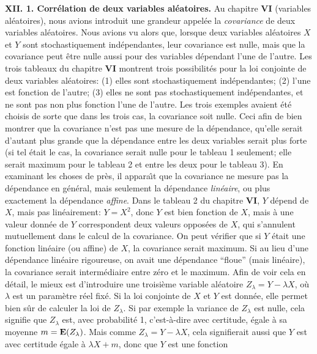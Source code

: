 {\bf XII. 1. Corr\'elation de deux variables al\'eatoires.}
\medskip 
Au chapitre {\bf VI} (variables al\'eatoires), nous avions introduit une 
grandeur appel\'ee la {\it covariance} de deux variables al\'eatoires. 
Nous avions vu alors que, lorsque deux variables al\'eatoires $X$ et $Y$ 
sont stochastiquement ind\'ependantes, leur covariance est nulle, mais 
que la covariance peut \^etre nulle aussi pour des variables d\'ependant 
l'une de l'autre. Les trois tableaux du chapitre {\bf VI} montrent trois 
possibilit\'es pour la loi conjointe de deux va\-ria\-bles al\'eatoires: 
(1) elles sont stochastiquement ind\'ependantes; (2) l'une est fonction de 
l'autre; (3) elles ne sont pas stochastiquement ind\'ependantes, et ne 
sont pas non plus fonction l'une de l'autre. Les trois exemples avaient
\'et\'e choisis de sorte que dans les trois cas, la covariance soit nulle. 
Ceci afin de bien montrer que la covariance n'est pas une mesure de la 
d\'ependance, qu'elle serait d'autant plus grande que la d\'ependance entre 
les deux varia\-bles serait plus forte (si tel \'etait le cas, la covariance 
serait nulle pour le tableau 1 seulement; elle serait maximum pour le 
tableau 2 et entre les deux pour le tableau 3). En examinant les
choses de pr\`es, il appara{\^\i}t que la covariance ne mesure pas
la d\'ependance en g\'en\'eral, mais seulement la d\'ependance
{\it lin\'eaire},  ou plus exactement la d\'ependance {\it affine}. 
Dans le tableau 2 du chapitre {\bf VI}, $Y$ d\'epend de $X$, 
mais pas lin\'eairement: $Y = X^2$, donc $Y$ est bien fonction de $X$, 
mais \`a une valeur donn\'ee de $Y$ correspondent deux valeurs 
oppos\'ees de $X$, qui s'annulent mutuellement dans le calcul de la 
covariance. On peut v\'erifier que si $Y$ \'etait une fonction lin\'eaire 
(ou affine) de $X$,  la covariance serait maximum. Si au lieu d'une 
d\'ependance lin\'eaire rigoureuse, on avait une d\'ependance ``floue'' 
(mais lin\'eaire),  la covariance serait interm\'ediaire entre 
z\'ero et le maximum. 
\medskip 
Afin de voir cela en d\'etail, le mieux est d'introduire une troisi\`eme
variable al\'eatoire $Z_\lambda = Y - \lambda X$, o\`u $\lambda$ est
un param\`etre r\'eel fix\'e. Si la loi conjointe de $X$ et $Y$ est 
donn\'ee, elle permet bien s\^ur de calculer la loi de $Z_\lambda$. Si 
par exemple la variance de $Z_\lambda$ est nulle, cela signifie que 
$Z_\lambda$ est, avec probabilit\'e 1, c'est-\`a-dire avec certitude, 
\'egale \`a sa moyenne $m = {\bf E}(Z_\lambda )$. Mais comme 
$Z_\lambda = Y - \lambda X$, cela signifierait aussi que $Y$ est avec 
certitude \'egale \`a $\lambda X + m$, donc que $Y$ est une fonction 
